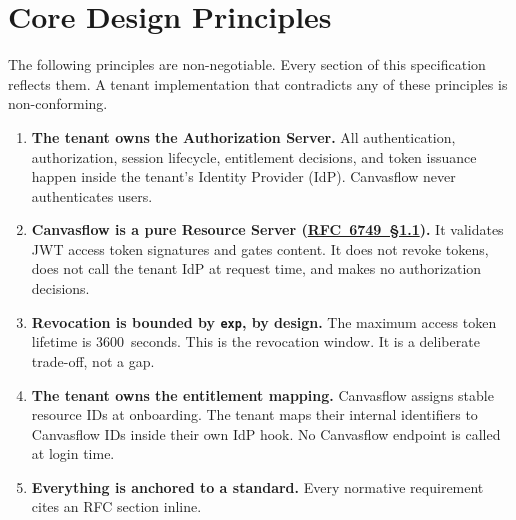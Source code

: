 \section*{Core Design Principles}

The following principles are non-negotiable. Every section of this specification
reflects them. A tenant implementation that contradicts any of these principles is
non-conforming.

\begin{enumerate}
  \item \textbf{The tenant owns the Authorization Server.} All authentication,
    authorization, session lifecycle, entitlement decisions, and token issuance happen
    inside the tenant's Identity Provider (IdP). Canvasflow never authenticates users.

    \item \textbf{Canvasflow is a pure Resource Server (\href{https://tools.ietf.org/html/rfc6749\#section-1.1}{RFC~6749~\S1.1}).} 
    It validates JWT access token signatures and gates content. It does not 
    revoke tokens, does not call the tenant IdP at request time, and makes no authorization decisions.

  \item \textbf{Revocation is bounded by \texttt{exp}, by design.} \label{sec:revocation} The maximum access
    token lifetime is 3600~seconds. This is the revocation window. It is a deliberate
    trade-off, not a gap.

  \item \textbf{The tenant owns the entitlement mapping.} Canvasflow assigns stable
    resource IDs at onboarding. The tenant maps their internal identifiers to Canvasflow
    IDs inside their own IdP hook. No Canvasflow endpoint is called at login time.

  \item \textbf{Everything is anchored to a standard.} Every normative requirement cites
    an RFC section inline.
\end{enumerate}